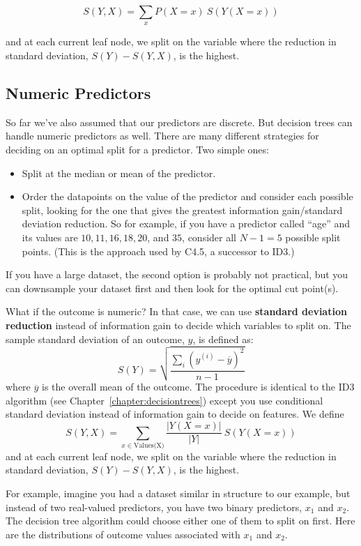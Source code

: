 $$ S(Y, X) = \sum_{x} P(X = x)~ S(Y(X=x)) $$

and at each current leaf node, we split on the variable where the reduction in standard deviation, $S(Y) - S(Y,X)$, is the highest. 

\subsection{Numeric Predictors}

So far we've also assumed that our predictors are discrete. But decision trees can handle numeric predictors as well. There are many different strategies for deciding on an optimal split for a predictor. Two simple ones:

\begin{itemize}
\item Split at the median or mean of the predictor.
\item Order the datapoints on the value of the predictor and consider each possible split, looking for the one that gives the greatest information gain/standard deviation reduction. So for example, if you have a predictor called ``age'' and its values are $10, 11, 16, 18, 20$, and $35$, consider all $N-1 = 5$ possible split points. (This is the approach used by C4.5, a successor to ID3.) 
\end{itemize}

If you have a large dataset, the second option is probably not practical, but you can downsample your dataset first and then look for the optimal cut point(s).

What if the outcome is numeric? In that case, we can use \textbf{standard deviation reduction} instead of information gain to decide which variables to split on. The sample standard deviation of an outcome, $y$, is defined as:
$$ S(Y) = \sqrt{\frac{\sum_i(y^{(i)} - \overline{y})^2}{n-1}} $$
where $\overline{y}$ is the overall mean of the outcome. The procedure is identical to the ID3 algorithm (see Chapter~\ref{chapter:decisiontrees}) except you use conditional standard deviation instead of information gain to decide on features. We define
$$ S(Y, X) = \sum_{x \in \text{Values(X)}} \frac{|Y(X=x)|}{|Y|}~ S(Y(X=x)) $$
and at each current leaf node, we split on the variable where the reduction in standard deviation, $S(Y) - S(Y,X)$, is the highest.

For example, imagine you had a dataset similar in structure to our example, but instead of two real-valued predictors, you have two binary predictors, $x_1$ and $x_2$. The decision tree algorithm could choose either one of them to split on first. Here are the distributions of outcome values associated with $x_1$ and $x_2$. 

